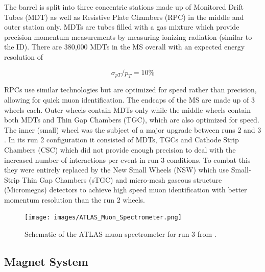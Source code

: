 The barrel is split into three concentric stations made up of Monitored Drift Tubes (MDT) as well as Resistive Plate 
Chambers (RPC) in the middle and outer station only. MDTs are tubes filled with a gas mixture which provide precision 
momentum measurements by measuring ionizing radiation (similar to the ID). There are 380,000 MDTs in the MS overall 
with an expected energy resolution of 

\begin{equation} %
\sigma_{pT}/p_T = 10\%
\end{equation}

RPCs use similar technologies but are optimized for speed rather than precision, allowing for quick muon identification. 
The endcaps of the MS are made up of 3 wheels each. Outer wheels contain MDTs only while the middle wheels contain both 
MDTs and Thin Gap Chambers (TGC), which are also optimized for speed. The inner (small) wheel was the subject of a major 
upgrade between runs 2 and 3 \cite{atlas-run3-setup}. In its run 2 configuration it consisted of MDTs, TGCs and Cathode 
Strip Chambers (CSC) which did not provide enough precision to deal with the increased number of interactions per event 
in run 3 conditions. To combat this they were entirely replaced by the New Small Wheels (NSW) which use Small-Strip Thin 
Gap Chambers (sTGC) and micro-mesh gaseous structure (Micromegas) detectors to achieve high speed muon identification 
with better momentum resolution than the run 2 wheels. \par

\begin{figure}
\centering
    \texttt{[image: images/ATLAS\_Muon\_Spectrometer.png]}
    \caption{Schematic of the ATLAS muon spectrometer for run 3 from \cite{atlas-run3-setup}.}
    \label{fig:ATLAS_Muon_Spectrometer}
\end{figure}

\subsection{Magnet System}

